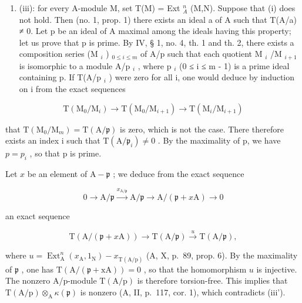 \begin{enumerate}
\def\labelenumi{(\roman{enumi})}
\setcounter{enumi}{2}
\tightlist
\item
  (iii): for every A-module M, set T(M) = Ext \(_{A}^{n}\) (M,N). Suppose that (i) does not hold. Then (no. 1, prop. 1) there exists an ideal a of A such that T(A/a) ≠ 0. Let p be an ideal of A maximal among the ideals having this property; let us prove that p is prime. By IV, § 1, no. 4, th. 1 and th. 2, there exists a composition series (M \(_{i}\) ) \(_{0\leqslant i\leqslant m}\) of A/p such that each quotient M \(_{i}\) /M \(_{i+1}\) is isomorphic to a module A/p \(_{i}\) , where p \(_{i}\) (0 ≤ i ≤ m - 1) is a prime ideal containing p. If T(A/p \(_{i}\) ) were zero for all i, one would deduce by induction on i from the exact sequences
\end{enumerate}

\[
\mathrm{T} \left(\mathrm{M} _ {0} / \mathrm{M} _ {i}\right) \longrightarrow \mathrm{T} \left(\mathrm{M} _ {0} / \mathrm{M} _ {i + 1}\right) \longrightarrow \mathrm{T} \left(\mathrm{M} _ {i} / \mathrm{M} _ {i + 1}\right)
\]

that \(\mathrm{T}(\mathrm{M}_{0}/\mathrm{M}_{m})=\mathrm{T}(\mathrm{A}/\mathfrak{p})\) is zero, which is not the case. There therefore exists an index i such that \(\mathrm{T}(\mathrm{A}/\mathfrak{p}_{i})\neq0\) . By the maximality of p, we have \(p=p_{i}\) , so that p is prime.

Let \(x\) be an element of \(\mathrm{A} - \mathfrak{p}\) ; we deduce from the exact sequence

\[
0 \rightarrow \mathrm{A} / \mathfrak {p} \stackrel {{x _ {\mathrm{A} / \mathfrak {p}}}} {{\longrightarrow}} \mathrm{A} / \mathfrak {p} \longrightarrow \mathrm{A} / (\mathfrak {p} + x \mathrm{A}) \rightarrow 0
\]

an exact sequence

\[
\mathrm{T} (\mathrm{A} / (\mathfrak {p} + x \mathrm{A})) \longrightarrow \mathrm{T} (\mathrm{A} / \mathfrak {p}) \stackrel {{u}} {{\longrightarrow}} \mathrm{T} (\mathrm{A} / \mathfrak {p}),
\]

where \(u = \operatorname{Ext}_{\mathrm{A}}^{n}(x_{\mathrm{A}}, 1_{\mathrm{N}}) - x_{\mathrm{T(A/p)}}\) (A, X, p.~89, prop. 6). By the maximality of \(\mathfrak{p}\) , one has \(\mathrm{T(A / (\mathfrak{p} + xA))} = 0\) , so that the homomorphism \(u\) is injective. The nonzero A/p-module \(\mathrm{T(A/p)}\) is therefore torsion-free. This implies that \(\mathrm{T(A/p)} \otimes_{\mathrm{A}} \kappa(\mathfrak{p})\) is nonzero (A, II, p.~117, cor. 1), which contradicts (iii').

